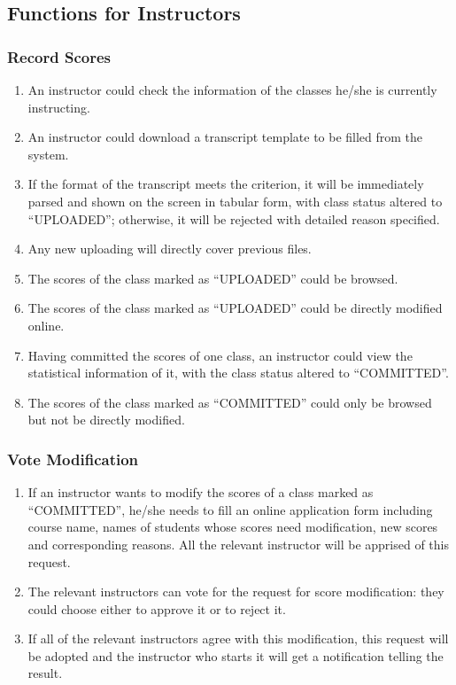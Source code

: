 \documentclass[a4]{article}
\begin{document}
\subsection{Functions for Instructors}
\subsubsection{Record Scores}
\begin{enumerate}
\item An instructor could check the information of the classes he/she is currently instructing.
\item An instructor could download a transcript template to be filled from the system.
\item If the format of the transcript meets the criterion, it will be immediately parsed and shown on the screen in tabular form, with class status altered to ``UPLOADED''; otherwise, it will be rejected with detailed reason specified.
\item Any new uploading will directly cover previous files.
\item The scores of the class marked as ``UPLOADED'' could be browsed.
\item The scores of the class marked as ``UPLOADED'' could be directly modified online.
\item Having committed the scores of one class, an instructor could view the statistical information of it, with the class status altered to ``COMMITTED''.
\item The scores of the class marked as ``COMMITTED'' could only be browsed but not be directly modified.
\end{enumerate}

\subsubsection{Vote Modification}
\begin{enumerate}
\item If an instructor wants to modify the scores of a class marked as ``COMMITTED'', he/she needs to fill an online application form including course name, names of students whose scores need modification, new scores and corresponding reasons. All the relevant instructor will be apprised of this request.
\item The relevant instructors can vote for the request for score modification: they could choose either to approve it or to reject it.
\item If all of the relevant instructors agree with this modification, this request will be adopted and the instructor who starts it will get a notification telling the result.
\end{enumerate}
\end{document}
